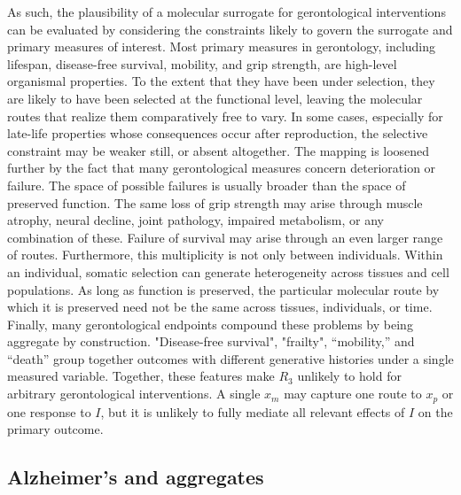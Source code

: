 \documentclass[twocolumn]{article} %
\begin{document}
As such, the plausibility of a molecular surrogate for gerontological interventions can be evaluated by considering the constraints likely to govern the surrogate and primary measures of interest. Most primary measures in gerontology, including lifespan, disease-free survival, mobility, and grip strength, are high-level organismal properties. To the extent that they have been under selection, they are likely to have been selected at the functional level, leaving the molecular routes that realize them comparatively free to vary. In some cases, especially for late-life properties whose consequences occur after reproduction, the selective constraint may be weaker still, or absent altogether. The mapping is loosened further by the fact that many gerontological measures concern deterioration or failure. The space of possible failures is usually broader than the space of preserved function. The same loss of grip strength may arise through muscle atrophy, neural decline, joint pathology, impaired metabolism, or any combination of these. Failure of survival may arise through an even larger range of routes. Furthermore, this multiplicity is not only between individuals. Within an individual, somatic selection can generate heterogeneity across tissues and cell populations. As long as function is preserved, the particular molecular route by which it is preserved need not be the same across tissues, individuals, or time. Finally, many gerontological endpoints compound these problems by being aggregate by construction. "Disease-free survival", "frailty", “mobility,” and “death” group together outcomes with different generative histories under a single measured variable. Together, these features make $R_3$ unlikely to hold for arbitrary gerontological interventions. A single $x_m$ may capture one route to $x_p$ or one response to $I$, but it is unlikely to fully mediate all relevant effects of $I$ on the primary outcome.

\subsection{Alzheimer's and aggregates}
\end{document}
